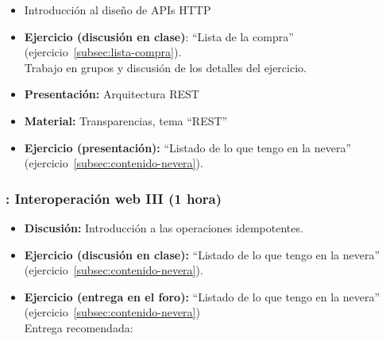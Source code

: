 \documentclass[a4paper,12pt]{article}
\begin{document}
\begin{itemize}
\item Introducción al diseño de APIs HTTP
\item \textbf{Ejercicio (discusión en clase)}: ``Lista de la compra'' (ejercicio~\ref{subsec:lista-compra}). \\
  Trabajo en grupos y discusión de los detalles del ejercicio.
\item \textbf{Presentación:} Arquitectura REST
\item \textbf{Material:} Transparencias, tema ``REST''
\item \textbf{Ejercicio (presentación):} ``Listado de lo que tengo en la nevera'' (ejercicio~\ref{subsec:contenido-nevera}).
\end{itemize}

\subsubsection{\juevesH: Interoperación web III (1 hora)}
\label{cal:juevesHb}

\begin{itemize}
\item \textbf{Discusión:} Introducción a las operaciones idempotentes.
\item \textbf{Ejercicio (discusión en clase):} ``Listado de lo que tengo en la nevera'' (ejercicio~\ref{subsec:contenido-nevera}).  
\item \textbf{Ejercicio (entrega en el foro):} ``Listado de lo que tengo en la nevera'' (ejercicio~\ref{subsec:contenido-nevera}) \\
  Entrega recomendada: \juevesI
\end{itemize}

\end{document}
